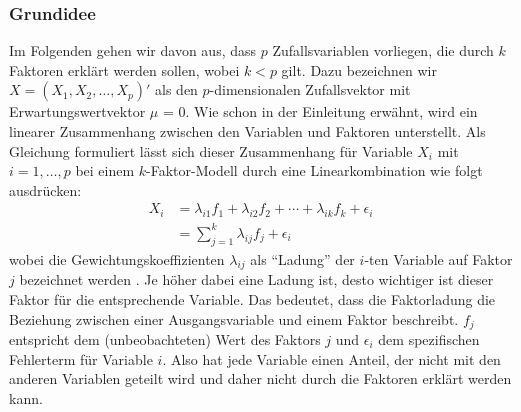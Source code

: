 \documentclass[11pt]{scrartcl}
\begin{document}
	\subsubsection{Grundidee}
	\label{Grundidee}
	Im Folgenden gehen wir davon aus, dass $p$  Zufallsvariablen vorliegen, die
	durch $k$
	Faktoren erklärt werden sollen, wobei $k < p$ gilt. Dazu bezeichnen wir $X = (X_1, X_2, \dotsc,
	X_p)' $ als den $p$-dimensionalen Zufallsvektor mit Erwartungswertvektor $\mu$ = 0. 
	Wie schon in der Einleitung erwähnt, wird ein linearer Zusammenhang zwischen den Variablen
	und Faktoren unterstellt.
	Als Gleichung formuliert lässt sich dieser Zusammenhang für Variable
	$X_i$ mit $i = 1,
	\dotsc, p$ bei einem $k$-Faktor-Modell durch eine Linearkombination wie folgt ausdrücken:
	\begin{equation} \label{Faktorgleichung}
		\begin{split}
			X_i &= \lambda_{i1}f_1 + \lambda_{i2}f_2 + \dotsb + \lambda_{ik}f_k + \epsilon_i \\
			&= \sum_{j=1}^{k} \lambda_{ij}f_j + \epsilon_i
		\end{split}
	\end{equation}
	wobei die Gewichtungskoeffizienten $\lambda_{ij}$
	als \enquote{Ladung}
	der $i$-ten Variable auf Faktor $j$ bezeichnet werden \parencite[409-410]{Rencher.2002}. Je höher
	dabei eine Ladung ist, desto wichtiger ist dieser Faktor für die entsprechende Variable. Das bedeutet, dass
	die Faktorladung die Beziehung zwischen einer Ausgangsvariable und einem Faktor beschreibt. $f_j$ entspricht dem (unbeobachteten)
	Wert des Faktors $j$ und $\epsilon_i$ dem spezifischen Fehlerterm
	für Variable $i$. Also hat jede Variable einen
	Anteil, der nicht mit den anderen Variablen geteilt wird und daher nicht durch die
	Faktoren erklärt werden kann. 
	
\end{document}
